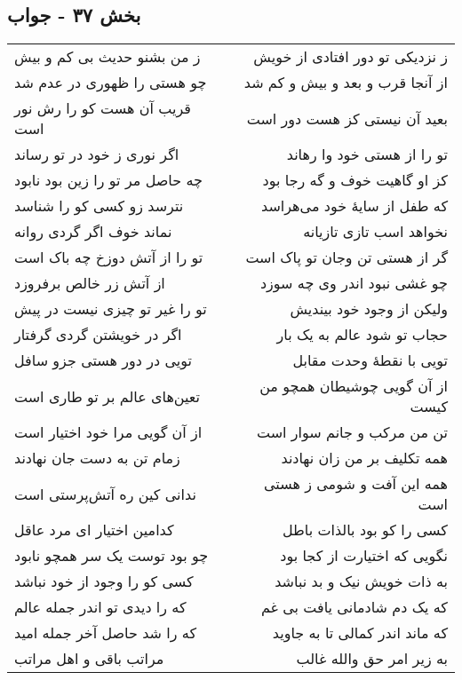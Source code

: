 \begin{center}
\section*{بخش ۳۷ - جواب}
\label{sec:sh037}
\begin{longtable}{l p{0.5cm} r}
ز من بشنو حدیث بی کم و بیش
&&
ز نزدیکی تو دور افتادی از خویش
\\
چو هستی را ظهوری در عدم شد
&&
از آنجا قرب و بعد و بیش و کم شد
\\
قریب آن هست کو را رش نور است
&&
بعید آن نیستی کز هست دور است
\\
اگر نوری ز خود در تو رساند
&&
تو را از هستی خود وا رهاند
\\
چه حاصل مر تو را زین بود نابود
&&
کز او گاهیت خوف و گه رجا بود
\\
نترسد زو کسی کو را شناسد
&&
که طفل از سایهٔ خود می‌هراسد
\\
نماند خوف اگر گردی روانه
&&
نخواهد اسب تازی تازیانه
\\
تو را از آتش دوزخ چه باک است
&&
گر از هستی تن وجان تو پاک است
\\
از آتش زر خالص برفروزد
&&
چو غشی نبود اندر وی چه سوزد
\\
تو را غیر تو چیزی نیست در پیش
&&
ولیکن از وجود خود بیندیش
\\
اگر در خویشتن گردی گرفتار
&&
حجاب تو شود عالم به یک بار
\\
تویی در دور هستی جزو سافل
&&
تویی با نقطهٔ وحدت مقابل
\\
تعین‌های عالم بر تو طاری است
&&
از آن گویی چوشیطان همچو من کیست
\\
از آن گویی مرا خود اختیار است
&&
تن من مرکب و جانم سوار است
\\
زمام تن به دست جان نهادند
&&
همه تکلیف بر من زان نهادند
\\
ندانی کین ره آتش‌پرستی است
&&
همه این آفت و شومی ز هستی است
\\
کدامین اختیار ای مرد عاقل
&&
کسی را کو بود بالذات باطل
\\
چو بود توست یک سر همچو نابود
&&
نگویی که اختیارت از کجا بود
\\
کسی کو را وجود از خود نباشد
&&
به ذات خویش نیک و بد نباشد
\\
که را دیدی تو اندر جمله عالم
&&
که یک دم شادمانی یافت بی غم
\\
که را شد حاصل آخر جمله امید
&&
که ماند اندر کمالی تا به جاوید
\\
مراتب باقی و اهل مراتب
&&
به زیر امر حق والله غالب
\\

\end{longtable}
\end{center}
